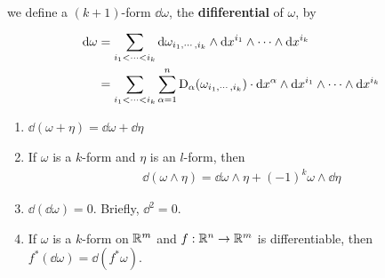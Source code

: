 we define a $(k+1)$-form $\dd\omega$, the \textbf{dififerential} of $\omega$, by 
\begin{align*}
    \mathrm{d}\omega 
    & = \sum_{i_1<\cdots<i_k}^{}{\mathrm{d}\omega_{i_1,\cdots,i_k}\wedge\mathrm{d} x^{i_1}\wedge\cdots\wedge\mathrm{d} x^{i_k}}\\
    & = \sum_{i_1<\cdots<i_k}^{}{\sum_{\alpha=1}^{n}{\mathrm{D}_\alpha(\omega_{i_1,\cdots,i_k})\cdot \mathrm{d} x^\alpha\wedge\mathrm{d} x^{i_1}\wedge\cdots\wedge\mathrm{d} x^{i_k}}}
\end{align*}

\begin{theorem}
    \begin{enumerate}[label=\upshape{(\arabic*)}]
        \item $\dd (\omega+\eta) = \dd\omega + \dd\eta$
        \item If $\omega$ is a $k$-form and $\eta$ is an $l$-form, then
            \begin{align*}
                \dd(\omega\wedge\eta) = \dd\omega\wedge\eta + (-1)^k\omega\wedge\dd\eta
            \end{align*}
        \item $\dd(\dd \omega) = 0$. Briefly, $\dd^2 = 0$.%
        \item If $\omega$ is a $k$-form on $\mathbb{R}^m$ and $f:\mathbb{R}^n\to \mathbb{R}^m$ is 
            differentiable, then $f^*(\dd\omega) = \dd(f^*\omega)$.
    \end{enumerate}
\end{theorem}

